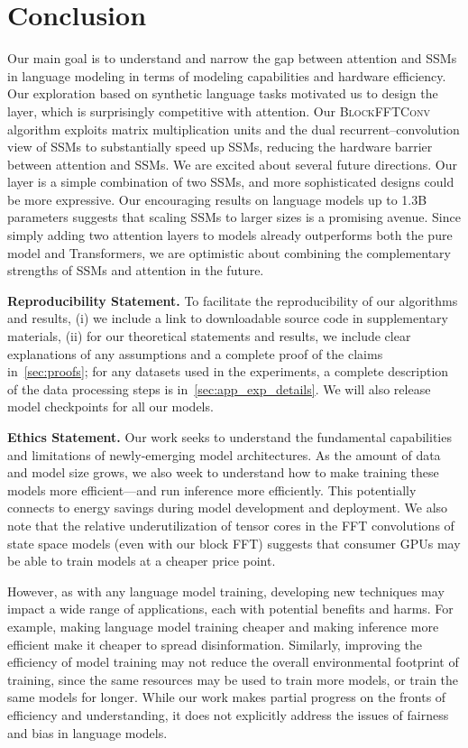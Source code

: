 
\section{Conclusion}
\label{sec:conc}

Our main goal is to understand and narrow the gap between attention and SSMs in
language modeling in terms of modeling capabilities and hardware efficiency.
Our exploration based on synthetic language tasks motivated us to design the
\hthree layer, which is surprisingly competitive with attention.
Our \textsc{BlockFFTConv} algorithm exploits matrix multiplication units and the
dual recurrent--convolution view of SSMs to substantially speed up SSMs, reducing
the hardware barrier between attention and SSMs.
We are excited about several future directions.
Our \hthree layer is a simple combination of two SSMs, and more
sophisticated designs could be more expressive.
Our encouraging results on language models up to 1.3B parameters suggests that
scaling SSMs to larger sizes is a promising avenue.
Since simply adding two attention layers to \hthree models already
outperforms both the pure \hthree model and Transformers, we are optimistic
about combining the complementary strengths of SSMs and attention in the future.

\ifarxiv

\else
\textbf{Reproducibility Statement.} To facilitate the reproducibility of our
algorithms and results, (i) we include a link to downloadable source code in
supplementary materials, (ii) for our theoretical statements and results, we
include clear explanations of any assumptions and a complete proof of the claims
in~\cref{sec:proofs}; for any datasets used in the experiments, a complete description of the data processing steps is in~\cref{sec:app_exp_details}.
We will also release model checkpoints for all our models.

\textbf{Ethics Statement.}
Our work seeks to understand the fundamental capabilities and limitations of newly-emerging model architectures.
As the amount of data and model size grows, we also week to understand how to make training these models more efficient---and run inference more efficiently.
This potentially connects to energy savings during model development and deployment.
We also note that the relative underutilization of tensor cores in the FFT convolutions of state space models (even with our block FFT) suggests that consumer GPUs may be able to train models at a cheaper price point.

However, as with any language model training, developing new techniques may impact a wide range of applications, each with potential benefits and harms.
For example, making language model training cheaper and making inference more efficient make it cheaper to spread disinformation.
Similarly, improving the efficiency of model training may not reduce the overall environmental footprint of training, since the same resources may be used to train more models, or train the same models for longer.
While our work makes partial progress on the fronts of efficiency and understanding, it does not explicitly address the issues of fairness and bias in language models.
\fi
